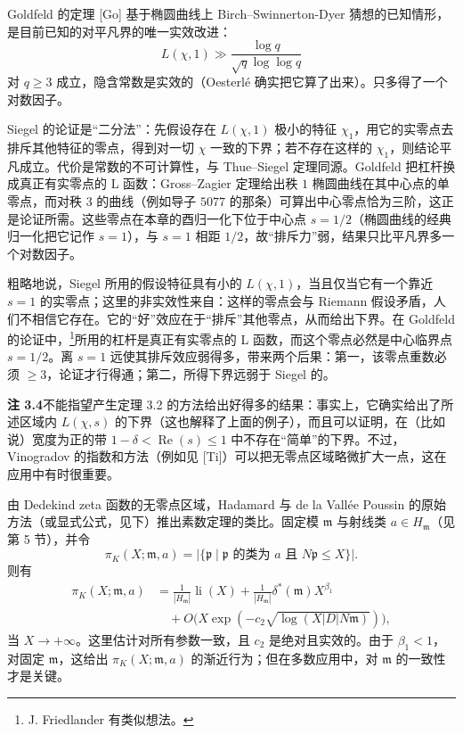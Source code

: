 Goldfeld 的定理 [Go] 基于椭圆曲线上 Birch--Swinnerton-Dyer 猜想的已知情形，是目前已知的对平凡界的唯一实效改进：
\[
L(\chi,1)\gg\frac{\log q}{\sqrt{q}\log\log q}
\]
对 $q\ge3$ 成立，隐含常数是实效的（Oesterlé 确实把它算了出来）。只多得了一个对数因子。

\begin{annote}
Siegel 的论证是“二分法”：先假设存在 $L(\chi,1)$ 极小的特征 $\chi_1$，用它的实零点去排斥其他特征的零点，得到对一切 $\chi$ 一致的下界；若不存在这样的 $\chi_1$，则结论平凡成立。代价是常数的不可计算性，与 Thue--Siegel 定理同源。Goldfeld 把杠杆换成真正有实零点的 L 函数：Gross--Zagier 定理给出秩 $1$ 椭圆曲线在其中心点的单零点，而对秩 $3$ 的曲线（例如导子 $5077$ 的那条）可算出中心零点恰为三阶，这正是论证所需。这些零点在本章的酉归一化下位于中心点 $s=1/2$（椭圆曲线的经典归一化把它记作 $s=1$），与 $s=1$ 相距 $1/2$，故“排斥力”弱，结果只比平凡界多一个对数因子。
\par\vspace{0.15em}{\raggedleft 【来源：Goldfeld [Go]（A）；Davenport《Multiplicative Number Theory》Siegel 零点一章（A）；Iwaniec--Kowalski《Analytic Number Theory》相应章节（A）】\par}
\end{annote}

粗略地说，Siegel 所用的假设特征具有小的 $L(\chi,1)$，当且仅当它有一个靠近 $s=1$ 的实零点；这里的非实效性来自：这样的零点会与 Riemann 假设矛盾，人们不相信它存在。它的“好”效应在于“排斥”其他零点，从而给出下界。在 Goldfeld 的论证中，\footnote{J. Friedlander 有类似想法。}所用的杠杆是真正有实零点的 L 函数，而这个零点必然是中心临界点 $s=1/2$。离 $s=1$ 远使其排斥效应弱得多，带来两个后果：第一，该零点重数必须 $\ge3$，论证才行得通；第二，所得下界远弱于 Siegel 的。

\par\medskip\noindent\textbf{注 3.4}\quad 不能指望产生定理 3.2 的方法给出好得多的结果：事实上，它确实给出了所述区域内 $L(\chi,s)$ 的下界（这也解释了上面的例子），而且可以证明，在（比如说）宽度为正的带 $1-\delta<\operatorname{Re}(s)\le1$ 中不存在“简单”的下界。不过，Vinogradov 的指数和方法（例如见 [Ti]）可以把无零点区域略微扩大一点，这在应用中有时很重要。

由 Dedekind zeta 函数的无零点区域，Hadamard 与 de la Vallée Poussin 的原始方法（或显式公式，见下）推出素数定理的类比。固定模 $\mathfrak{m}$ 与射线类 $a\in H_{\mathfrak{m}}$（见第 5 节），并令
\[
\pi_K(X;\mathfrak{m},a)=\bigl|\{\mathfrak{p}\mid \mathfrak{p}\text{ 的类为 }a\text{ 且 }N\mathfrak{p}\le X\}\bigr|.
\]
则有
\begin{equation}\tag{3.5}\label{c2:eq:3.5}
\begin{aligned}
\pi_K(X;\mathfrak{m},a)&=\frac{1}{|H_{\mathfrak{m}}|}\operatorname{li}(X)+\frac{1}{|H_{\mathfrak{m}}|}\delta^*(\mathfrak{m})X^{\beta_1}\\
&\quad+O\bigl(X\exp(-c_2\sqrt{\log(X|D|N\mathfrak{m})})\bigr),
\end{aligned}
\end{equation}
当 $X\to+\infty$。这里估计对所有参数一致，且 $c_2$ 是绝对且实效的。由于 $\beta_1<1$，对固定 $\mathfrak{m}$，这给出 $\pi_K(X;\mathfrak{m},a)$ 的渐近行为；但在多数应用中，对 $\mathfrak{m}$ 的一致性才是关键。

